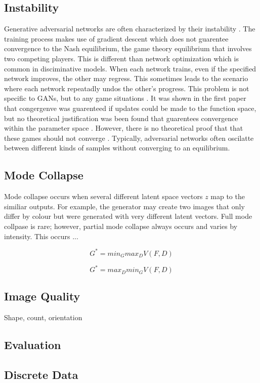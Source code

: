 \documentclass[11pt]{article}
\begin{document}
\subsection{Instability}
Generative adversarial networks are often characterized by their instability \citep{2017arXiv170100160G}. The training process makes use of gradient descent which does not guarentee convergence to the Nash equilibrium, the game theory equilibrium that involves two competing players. This is different than network optimization which is common in disciminative models. When each network trains, even if the specified network improves, the other may regress. This sometimes leads to the scenario where each network repeatadly undos the other's progress. This problem is not specific to GANs, but to any game situations \citep{2017arXiv170100160G}. It was shown in the first paper that congergenve was guarenteed if updates could be made to the function space, but no theoretical justification was been found that guarentees convergence within the parameter space \citep{2014arXiv1406.2661G}. However, there is no theoretical proof that that these games should not converge \citep{2017arXiv170100160G}. Typically, adversarial networks often oscilatte between different kinds of samples without converging to an equilibrium.

\subsection{Mode Collapse}
Mode collapse occurs when several different latent space vectors $z$ map to the similiar outputs. For example, the generator may create two images that only differ by colour but were generated with very different latent vectors. Full mode collpase is rare; however, partial mode collapse always occurs and varies by intensity. This occurs ...

$$G^* = min_Gmax_DV(F, D)$$

$$G^* = max_Dmin_GV(F, D)$$

\subsection{Image Quality}
Shape, count, orientation

\subsection{Evaluation}
\subsection{Discrete Data}
\end{document}
